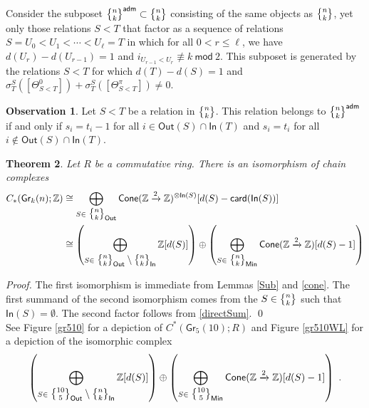\documentclass{article}
\newcommand{\msf}[1]{\mathsf{#1}}
\newcommand{\gr}{\msf{Gr}}
\newcommand{\nchoosek}{\textstyle\genfrac{\lbrace}{\rbrace}{0pt}{}}
\newcommand{\card}{\msf{card}}
\newcommand{\cone}{\msf{Cone}}
\newcommand{\In}{\msf{In}}
\newcommand{\Out}{\msf{Out}}
\newcommand{\adm}{\msf{adm}}
\newtheorem{theorem}{Theorem}[section]
\theoremstyle{definition}
\newtheorem{observation}[theorem]{Observation}
\begin{document}
Consider the subposet $\nchoosek{n}{k}^\adm \subset \nchoosek{n}{k}$ consisting of the same objects as
$\nchoosek{n}{k}$, yet only those relations $S < T$ that factor as a sequence of relations
$S=U_0 < U_1 < \cdots < U_\ell = T$ in which for all $0<r \le \ell$, we have
$d(U_r)-d(U_{r-1}) = 1$ and $i_{U_{r-1}<U_r} \not\equiv k ~\msf{mod}~ 2$. 
This subposet is generated by the relations $S < T$ for which $d(T)-d(S) = 1$ and 
$\sigma^S_T([\Theta_{S<T}^0])+\sigma^S_T([\Theta_{S<T}^\pi]) \neq 0$. 
\begin{observation}\label{admissible}
    Let $S<T$ be a relation in $\nchoosek{n}{k}$. This relation belongs to $\nchoosek{n}{k}^\adm$ if and
    only if $s_i=t_i-1$ for all $i \in \Out(S)\cap \In(T)$ and $s_i=t_i$ for all $i \not\in \Out(S) \cap \In(T)$. 
\end{observation}

\begin{theorem}\label{cochainDecomp}
    Let $R$ be a commutative ring. There is an isomorphism of chain complexes
    \begin{align*}
        C_*(\gr_k(n);\ZZ) &\cong \bigoplus_{S \in \nchoosek{n}{k}_\Out}
            \cone(\ZZ \xrightarrow{2} \ZZ)^{\otimes \In(S)}[d(S)-\card(\In(S))] \\
        &\cong \left(\bigoplus_{S \in \nchoosek{n}{k}_\Out \setminus \nchoosek{n}{k}_\In} \ZZ[d(S)]\right) \oplus
            \left(\bigoplus_{S \in \nchoosek{n}{k}_\msf{Min}} \cone(\ZZ \xrightarrow{2}\ZZ)[d(S)-1]\right)
    \end{align*}
\end{theorem}
{\it Proof.}
The first isomorphism is immediate from Lemmas \ref{Sub} and \ref{cone}. 
The first summand of the second isomorphism comes from the
$S \in \nchoosek{n}{k}$ such that $\In(S) = \emptyset$. The second factor follows from \ref{directSum}.
\qed \\

See Figure \ref{gr510} for a depiction of $C^*(\gr_5(10);R)$ and Figure \ref{gr510WL} for a depiction of the 
isomorphic complex
$$\left(\bigoplus_{S \in \nchoosek{10}{5}_\Out \setminus \nchoosek{n}{k}_\In} \ZZ[d(S)]\right) \oplus
        \left(\bigoplus_{S \in \nchoosek{10}{5}_\msf{Min}} \cone(\ZZ \xrightarrow{2}\ZZ)[d(S)-1]\right)~.$$
\end{document}
